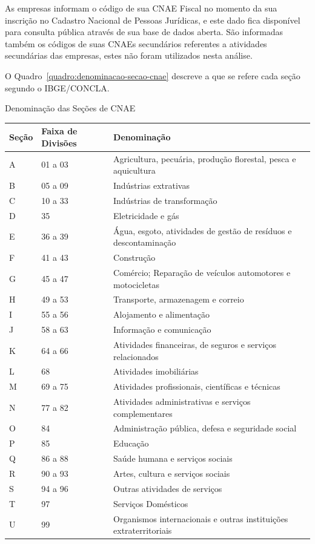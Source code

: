 As empresas informam o código de sua CNAE Fiscal no momento da sua inscrição no Cadastro Nacional de Pessoas Jurídicas, e este dado fica disponível para consulta pública através de sua base de dados aberta. São informadas também os códigos de suas CNAEs secundários referentes a atividades secundárias das empresas, estes não foram utilizados nesta análise.

O Quadro~\ref{quadro:denominacao-secao-cnae} descreve a que se refere cada seção segundo o IBGE/CONCLA.

\begin{quadro}[htb]
\caption{Denominação das Seções de CNAE}
\label{quadro:denominacao-secao-cnae}
\centering
\begin{tabularx}{\textwidth}{|l|l|X|}        \hline
\textbf{Seção} & \textbf{Faixa de Divisões} & \textbf{Denominação} \\ \hline
A & 01 a 03 & Agricultura, pecuária, produção florestal, pesca e aquicultura \\ \hline
B & 05 a 09 & Indústrias extrativas \\ \hline
C & 10 a 33 & Indústrias de transformação \\ \hline
D & 35      & Eletricidade e gás \\ \hline
E & 36 a 39 & Água, esgoto, atividades de gestão de resíduos e descontaminação \\ \hline
F & 41 a 43 & Construção \\ \hline
G & 45 a 47 & Comércio; Reparação de veículos automotores e motocicletas \\ \hline
H & 49 a 53 & Transporte, armazenagem e correio \\ \hline
I & 55 a 56 & Alojamento e alimentação \\ \hline
J & 58 a 63 & Informação e comunicação \\ \hline
K & 64 a 66 & Atividades financeiras, de seguros e serviços relacionados \\ \hline
L & 68      & Atividades imobiliárias \\ \hline
M & 69 a 75 & Atividades profissionais, científicas e técnicas \\ \hline
N & 77 a 82 & Atividades administrativas e serviços complementares \\ \hline
O & 84      & Administração pública, defesa e seguridade social \\ \hline
P & 85      & Educação \\ \hline
Q & 86 a 88 & Saúde humana e serviços sociais \\ \hline
R & 90 a 93 & Artes, cultura e serviços sociais \\ \hline
S & 94 a 96 & Outras atividades de serviços \\ \hline
T & 97      & Serviços Domésticos \\ \hline
U & 99      & Organismos internacionais e outras instituições extraterritoriais \\ \hline
\end{tabularx}
\end{quadro}

